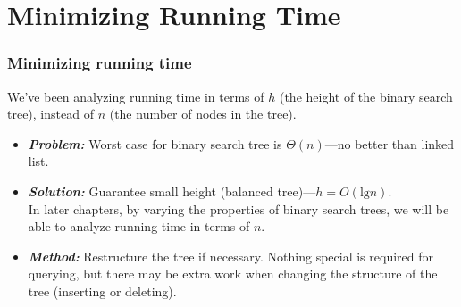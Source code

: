 \documentclass[notes,serif]{beamer}
\begin{document}
\section{Minimizing Running Time}
\begin{frame}
  \frametitle{Minimizing running time}
  We've been analyzing running time in terms of $h$ (the height of the binary search tree), instead of $n$ (the number of nodes in
the tree).
  \begin{itemize}
    \item {\bf \em Problem:} Worst case for binary search tree is $\Theta(n)$---no better than linked
list.
    \item {\bf \em Solution:} Guarantee small height (balanced tree)---$h = O(\text{lg} n)$.\\
    In later chapters, by varying the properties of binary search trees, we will be
    able to analyze running time in terms of $n$.
    \item {\bf \em Method:} Restructure the tree if necessary.  Nothing special is required for
querying, but there may be extra work when changing the structure of the tree
(inserting or deleting).
  \end{itemize}
\end{frame}
\end{document}
